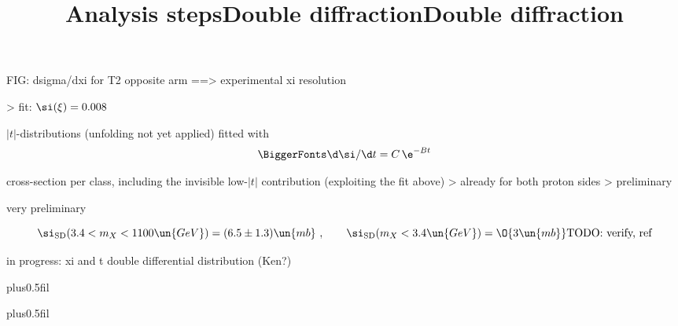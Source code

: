 \> FIG: dsigma/dxi for T2 opposite arm ==> experimental xi resolution


\>> fit: $\si(\xi) = 0.008$

\newpage %
\title{Analysis steps}

\vskip-5mm

\> $|t|$-distributions (unfolding not yet applied) fitted with
\cLRe$$\BiggerFonts \displaystyle \d\si / \d t = C\, \e^{-B t}$$\cFg

\vskip-1mm


\> cross-section per class, including the invisible low-$|t|$ contribution (exploiting the fit above)
\>> already for both proton sides
\>> preliminary

\centerline{}

\> very preliminary

$$\si_{\rm SD}(3.4 < m_X < 1100\un{GeV}) = (6.5 \pm 1.3)\un{mb}\ ,\qquad \si_{\rm SD}(m_X < 3.4\un{GeV}) = \O{3\un{mb}} \hbox{TODO: verify, ref}$$

\> in progress: xi and t double differential distribution (Ken?)

\newpage %
\hbox{}
\vfil
\title{Double diffraction}

\vskip0pt plus0.5fil

\vskip0pt plus0.5fil

\newpage %
\title{Double diffraction}

